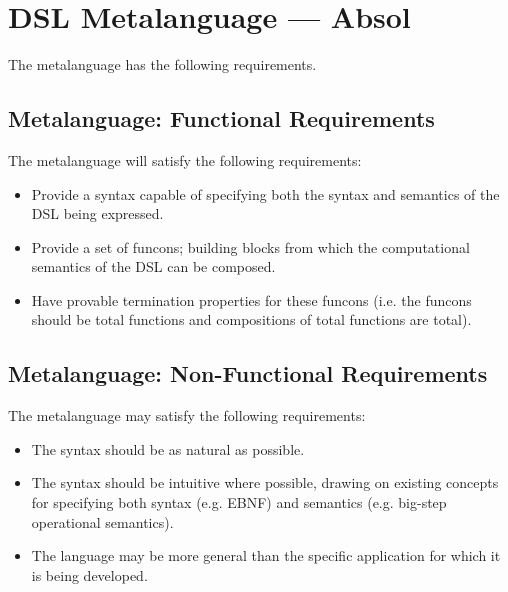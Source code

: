 \documentclass[a4paper,11pt]{report}
\begin{document}



\section{DSL Metalanguage --- Absol} %
\label{sec:dsl_metalanguage_absol}
The metalanguage has the following requirements.

\subsection{Metalanguage: Functional Requirements} %
\label{sub:metalanguage_functional_requirements}
The metalanguage will satisfy the following requirements:
\begin{itemize}
    \item Provide a syntax capable of specifying both the syntax and semantics of the DSL being expressed.
    \item Provide a set of funcons; building blocks from which the computational semantics of the DSL can be composed. 
    \item Have provable termination properties for these funcons (i.e. the funcons should be total functions and compositions of total functions are total).
\end{itemize}


\subsection{Metalanguage: Non-Functional Requirements} %
\label{sub:metalanguage_non_functional_requirements}
The metalanguage may satisfy the following requirements:
\begin{itemize}
    \item The syntax should be as natural as possible.
    \item The syntax should be intuitive where possible, drawing on existing concepts for specifying both syntax (e.g. EBNF) and semantics (e.g. big-step operational semantics).
    \item The language may be more general than the specific application for which it is being developed.
\end{itemize}

\end{document}
